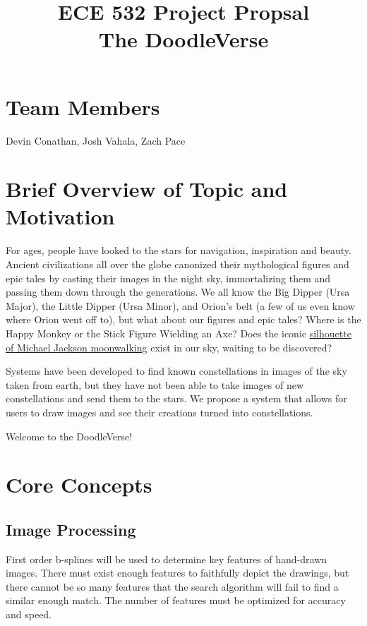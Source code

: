 \documentclass{article}
\title{
\horrule{1pt}
ECE 532 Project Propsal\\\vspace{1cm}\huge \textbf{The DoodleVerse}
\horrule{0.5pt}
}
\date{}
\author{}
\makeatletter
\let\saved@bibitem\@bibitem
\makeatother
\begin{document}
\begingroup
  \makeatletter
  \let\@bibitem\saved@bibitem
  
\endgroup
\maketitle

\section{Team Members}
Devin Conathan, Josh Vahala, Zach Pace 

\section{Brief Overview of Topic and Motivation}
For ages, people have looked to the stars for navigation, inspiration and beauty. Ancient civilizations all over the globe canonized their mythological figures and epic tales by casting their images in the night sky, immortalizing them and passing them down through the generations.  We all know the Big Dipper (Ursa Major), the Little Dipper (Ursa Minor), and Orion's belt (a few of us even know where Orion went off to), but what about our figures and epic tales?  Where is the Happy Monkey or the Stick Figure Wielding an Axe?  Does the iconic \href{http://cliparts.co/cliparts/qiB/yEg/qiByEg5i5.jpg}{silhouette of Michael Jackson moonwalking} exist in our sky, waiting to be discovered?

Systems have been developed to find known constellations in images of the sky taken from earth, but they have not been able to take images of new constellations and send them to the stars. We propose a system that allows for users to draw images and see their creations turned into constellations.

Welcome to the DoodleVerse!
\section{Core Concepts}

\subsection{Image Processing}
First order b-splines will be used to determine key features of hand-drawn images. There must exist enough features to faithfully depict the drawings, but there cannot be so many features that the search algorithm will fail to find a similar enough match. The number of features must be optimized for accuracy and speed.
\end{document}
